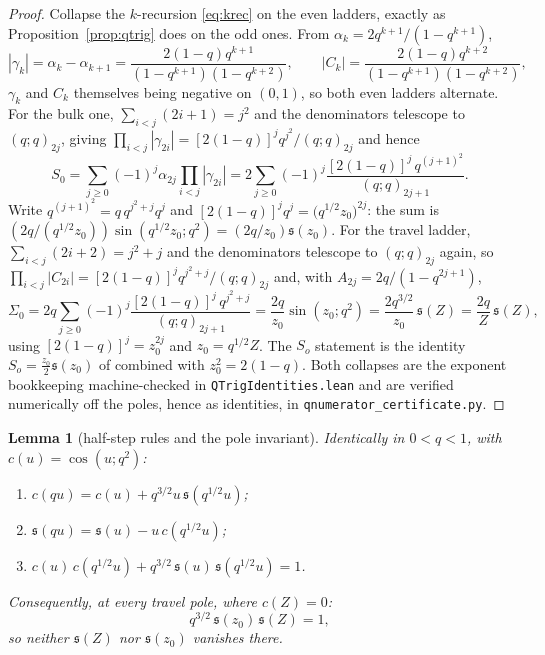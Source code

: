 \documentclass[11pt]{article}
\theoremstyle{plain}
\newtheorem{lemma}[theorem]{Lemma}
\theoremstyle{definition}
\theoremstyle{remark}
\theoremstyle{plain}\newtheorem*{maintheorem}{Main Theorem}
\begin{document}
\begin{proof}
Collapse the $k$-recursion \eqref{eq:krec} on the even ladders, exactly as
Proposition~\ref{prop:qtrig} does on the odd ones. From $\alpha_k=2q^{k+1}/(1-q^{k+1})$,
\[
  |\gamma_k|=\alpha_k-\alpha_{k+1}=\frac{2(1-q)q^{k+1}}{(1-q^{k+1})(1-q^{k+2})},\qquad
  |C_k|=\frac{2(1-q)q^{k+2}}{(1-q^{k+1})(1-q^{k+2})} ,
\]
$\gamma_k$ and $C_k$ themselves being negative on $(0,1)$, so both even ladders alternate. For the bulk one,
$\sum_{i<j}(2i+1)=j^2$ and the denominators telescope to $(q;q)_{2j}$, giving
$\prod_{i<j}|\gamma_{2i}|=[2(1-q)]^jq^{j^2}/(q;q)_{2j}$ and hence
\[
  S_0=\sum_{j\ge0}(-1)^j\alpha_{2j}\prod_{i<j}|\gamma_{2i}|
     =2\sum_{j\ge0}(-1)^j\frac{[2(1-q)]^j\,q^{(j+1)^2}}{(q;q)_{2j+1}} .
\]
Write $q^{(j+1)^2}=q\,q^{j^2+j}q^{j}$ and $[2(1-q)]^jq^{j}=\bigl(q^{1/2}z_0\bigr)^{2j}$: the sum is
$(2q/(q^{1/2}z_0))\sin(q^{1/2}z_0;q^2)=(2q/z_0)\mathfrak s(z_0)$. For the travel ladder,
$\sum_{i<j}(2i+2)=j^2+j$ and the denominators telescope to $(q;q)_{2j}$ again, so
$\prod_{i<j}|C_{2i}|=[2(1-q)]^jq^{j^2+j}/(q;q)_{2j}$ and, with $A_{2j}=2q/(1-q^{2j+1})$,
\[
  \Sigma_0=2q\sum_{j\ge0}(-1)^j\frac{[2(1-q)]^j\,q^{j^2+j}}{(q;q)_{2j+1}}
          =\frac{2q}{z_0}\sin(z_0;q^2)=\frac{2q^{3/2}}{z_0}\,\mathfrak s(Z)=\frac{2q}{Z}\,\mathfrak s(Z),
\]
using $[2(1-q)]^j=z_0^{2j}$ and $z_0=q^{1/2}Z$. The $S_o$ statement is the identity $S_o=\tfrac{z_0}2\mathfrak s(z_0)$ of
\cite[Lemma ``the gate block in closed form'', \textup{lem:P12closed}]{Bonfioli2026bB} combined with $z_0^2=2(1-q)$. Both collapses are the exponent
bookkeeping machine-checked in \texttt{QTrigIdentities.lean} and are verified numerically off the
poles, hence as identities, in \texttt{qnumerator\_certificate.py}.
\end{proof}

\begin{lemma}[half-step rules and the pole invariant]\label{lem:halfstep}
Identically in $0<q<1$, with $c(u)=\cos(u;q^2)$:
\begin{enumerate}[label=\textup{(\roman*)},leftmargin=2.2em,itemsep=0.1em,topsep=0.2em]
\item $c(qu)=c(u)+q^{3/2}u\,\mathfrak s(q^{1/2}u)$;
\item $\mathfrak s(qu)=\mathfrak s(u)-u\,c(q^{1/2}u)$;
\item $c(u)\,c(q^{1/2}u)+q^{3/2}\,\mathfrak s(u)\,\mathfrak s(q^{1/2}u)=1$.
\end{enumerate}
Consequently, at every travel pole, where $c(Z)=0$:
\[
   q^{3/2}\,\mathfrak s(z_0)\,\mathfrak s(Z)=1 ,
\]
so neither $\mathfrak s(Z)$ nor $\mathfrak s(z_0)$ vanishes there.
\end{lemma}
\end{document}
